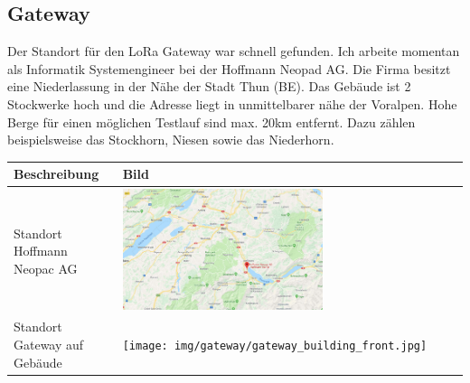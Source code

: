 \documentclass[11pt,english,german]{report}
\theoremstyle{definition}
\begin{document}
\subsection{Gateway}
Der Standort für den LoRa Gateway war schnell gefunden. Ich arbeite momentan als Informatik Systemengineer bei der Hoffmann Neopad AG. Die Firma besitzt eine Niederlassung in der Nähe der Stadt Thun (BE). Das Gebäude ist 2 Stockwerke hoch und die Adresse liegt in unmittelbarer nähe der Voralpen. Hohe Berge für einen möglichen Testlauf sind max. 20km entfernt. Dazu zählen beispielsweise das Stockhorn, Niesen sowie das Niederhorn.\\[0.1cm]
\begin{tabularx}{\textwidth}{ l|X }
		\textbf{Beschreibung} & \textbf{Bild} \\ \hline
		Standort Hoffmann Neopac AG & \parbox[c]{1em}{
			\vspace{8pt}\includegraphics[width=0.6\textwidth]{img/gateway/gateway_map.jpg}\vspace{8pt}} \\ \hline
		Standort Gateway auf Gebäude &  \parbox[c]{1em}{
			\vspace{8pt}\texttt{[image: img/gateway/gateway\_building\_front.jpg]}\vspace{8pt}} \\ \hline
\end{tabularx}

\newpage
\end{document}
